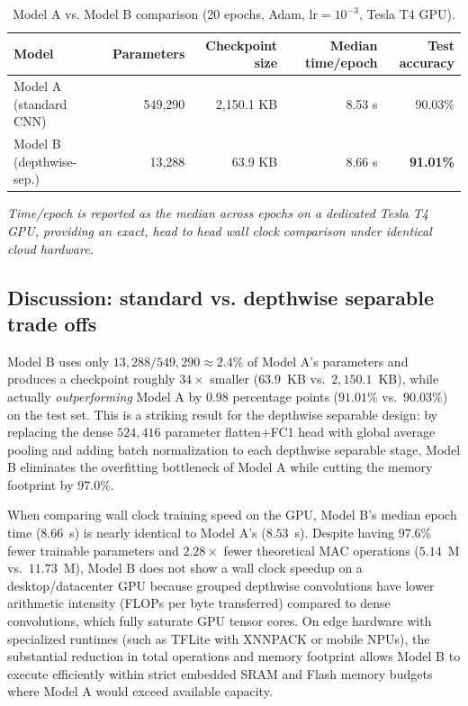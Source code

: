 \documentclass[11pt]{article}
\begin{document}
\begin{table}[H]
\centering
\caption{Model A vs. Model B comparison (20 epochs, Adam, $\text{lr}=10^{-3}$, Tesla T4 GPU).}
\label{tab:ab-comparison}
\begin{tabular}{lrrrr}
\toprule
Model & Parameters & Checkpoint size & Median time/epoch & Test accuracy \\
\midrule
Model A (standard CNN) & 549{,}290 & 2{,}150.1 KB & 8.53 s & 90.03\% \\
Model B (depthwise-sep.) & 13{,}288 & 63.9 KB & 8.66 s & \textbf{91.01\%} \\
\bottomrule
\end{tabular}
\end{table}
\emph{Time/epoch is reported as the median across epochs on a dedicated Tesla T4 GPU, providing an exact, head to head wall clock comparison under identical cloud hardware.}

\subsection{Discussion: standard vs. depthwise separable trade offs}

Model B uses only $13{,}288 / 549{,}290 \approx 2.4\%$ of Model A's
parameters and produces a checkpoint roughly $34\times$ smaller
($63.9$~KB vs.\ $2{,}150.1$~KB), while actually \emph{outperforming} Model A
by $0.98$ percentage points ($91.01\%$ vs.\ $90.03\%$) on the test set. This is
a striking result for the depthwise separable design: by replacing the dense
$524{,}416$ parameter flatten+FC1 head with global average pooling and adding
batch normalization to each depthwise separable stage, Model B eliminates the
overfitting bottleneck of Model A while cutting the memory footprint by $97.0\%$.

When comparing wall clock training speed on the GPU, Model B's median epoch time
($8.66$~s) is nearly identical to Model A's ($8.53$~s). Despite having $97.6\%$ fewer
trainable parameters and $2.28\times$ fewer theoretical MAC operations ($5.14$~M vs.\ $11.73$~M), Model B does
not show a wall clock speedup on a desktop/datacenter GPU because grouped depthwise
convolutions have lower arithmetic intensity (FLOPs per byte transferred) compared to dense
convolutions, which fully saturate GPU tensor cores. On edge hardware with specialized
runtimes (such as TFLite with XNNPACK or mobile NPUs), the substantial reduction in total
operations and memory footprint allows Model B to execute efficiently within strict embedded
SRAM and Flash memory budgets where Model A would exceed available capacity.
\end{document}
